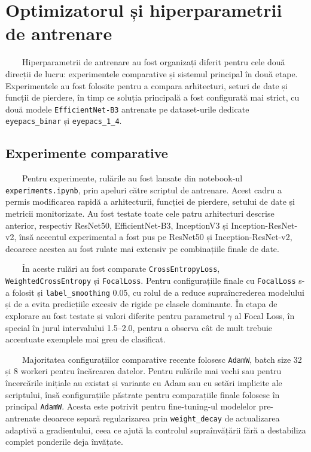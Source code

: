 \documentclass[12pt, a4paper, twoside, romanian]{teza-upb}
\begin{document}
\section{Optimizatorul și hiperparametrii de antrenare}

\ \ \ \ Hiperparametrii de antrenare au fost organizați diferit pentru cele două direcții de lucru:
experimentele comparative și sistemul principal în două etape. Experimentele au fost folosite pentru
a compara arhitecturi, seturi de date și funcții de pierdere, în timp ce soluția principală a fost
configurată mai strict, cu două modele \texttt{EfficientNet-B3} antrenate pe dataset-urile dedicate
\texttt{eyepacs\_binar} și \texttt{eyepacs\_1\_4}.

\subsection*{Experimente comparative}

\ \ \ \ Pentru experimente, rulările au fost lansate din notebook-ul
\texttt{experiments.ipynb}, prin apeluri către scriptul de antrenare. Acest cadru a permis modificarea
rapidă a arhitecturii, funcției de pierdere, setului de date și metricii monitorizate. Au fost testate
toate cele patru arhitecturi descrise anterior, respectiv ResNet50, EfficientNet-B3, InceptionV3 și
Inception-ResNet-v2, însă accentul experimental a fost pus pe ResNet50 și Inception-ResNet-v2,
deoarece acestea au fost rulate mai extensiv pe combinațiile finale de date.
\bigskip

\ \ \ \ În aceste rulări au fost comparate \texttt{CrossEntropyLoss},
\texttt{WeightedCrossEntropy} și \texttt{FocalLoss}. Pentru configurațiile finale cu
\texttt{FocalLoss} s-a folosit și \texttt{label\_smoothing} 0.05, cu rolul de a reduce supraîncrederea
modelului și de a evita predicțiile excesiv de rigide pe clasele dominante. În etapa de explorare au
fost testate și valori diferite pentru parametrul \(\gamma\) al Focal Loss, în special în jurul
intervalului 1.5--2.0, pentru a observa cât de mult trebuie accentuate exemplele mai greu de clasificat.
\bigskip

\ \ \ \ Majoritatea configurațiilor comparative recente folosesc \texttt{AdamW}, batch size 32 și
8 workeri pentru încărcarea datelor. Pentru rulările mai vechi sau pentru încercările inițiale au
existat și variante cu Adam sau cu setări implicite ale scriptului, însă configurațiile păstrate pentru
comparațiile finale folosesc în principal \texttt{AdamW}. Acesta este potrivit pentru fine-tuning-ul
modelelor pre-antrenate deoarece separă regularizarea prin \texttt{weight\_decay} de actualizarea
adaptivă a gradientului, ceea ce ajută la controlul supraînvățării fără a destabiliza complet
ponderile deja învățate.
\bigskip
 
\end{document}
